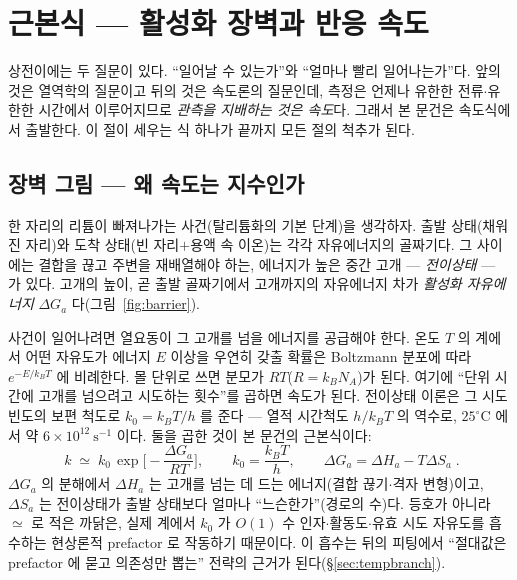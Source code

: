 \documentclass[11pt,a4paper]{article}
\begin{document}
\section{근본식 — 활성화 장벽과 반응 속도}\label{sec:rate}
상전이에는 두 질문이 있다. ``일어날 수 있는가''와 ``얼마나 빨리 일어나는가''다. 앞의 것은 열역학의 질문이고
뒤의 것은 속도론의 질문인데, 측정은 언제나 유한한 전류$\cdot$유한한 시간에서 이루어지므로 \emph{관측을
지배하는 것은 속도}다. 그래서 본 문건은 속도식에서 출발한다. 이 절이 세우는 식 하나가 끝까지 모든 절의
척추가 된다.

\subsection{장벽 그림 — 왜 속도는 지수인가}
한 자리의 리튬이 빠져나가는 사건(탈리튬화의 기본 단계)을 생각하자. 출발 상태(채워진 자리)와 도착 상태(빈
자리$+$용액 속 이온)는 각각 자유에너지의 골짜기다. 그 사이에는 결합을 끊고 주변을 재배열해야 하는, 에너지가
높은 중간 고개 — \emph{전이상태} — 가 있다. 고개의 높이, 곧 출발 골짜기에서 고개까지의 자유에너지 차가
\emph{활성화 자유에너지} $\Delta G_a$ 다(그림~\ref{fig:barrier}).

사건이 일어나려면 열요동이 그 고개를 넘을 에너지를 공급해야 한다. 온도 $T$ 의 계에서 어떤 자유도가 에너지
$E$ 이상을 우연히 갖출 확률은 Boltzmann 분포에 따라 $e^{-E/k_BT}$ 에 비례한다. 몰 단위로 쓰면 분모가
$RT$($R=k_BN_A$)가 된다. 여기에 ``단위 시간에 고개를 넘으려고 시도하는 횟수''를 곱하면 속도가 된다.
전이상태 이론은 그 시도 빈도의 보편 척도로 $k_0=k_BT/h$ 를 준다 \cite{eyring1935} — 열적 시간척도
$h/k_BT$ 의 역수로, $25^\circ$C 에서 약 $6\times10^{12}\ \mathrm{s^{-1}}$ 이다. 둘을 곱한 것이 본 문건의
근본식이다:
\begin{equation}
\boxed{\;k\;\simeq\;k_0\,\exp\!\Big[-\frac{\Delta G_a}{RT}\Big],\qquad
k_0=\frac{k_BT}{h},\qquad \Delta G_a=\Delta H_a-T\Delta S_a\;.}
\label{eq:eyring}
\end{equation}
$\Delta G_a$ 의 분해에서 $\Delta H_a$ 는 고개를 넘는 데 드는 에너지(결합 끊기$\cdot$격자 변형)이고,
$\Delta S_a$ 는 전이상태가 출발 상태보다 얼마나 ``느슨한가''(경로의 수)다. 등호가 아니라 $\simeq$ 로 적은
까닭은, 실제 계에서 $k_0$ 가 $O(1)$ 수 인자$\cdot$활동도$\cdot$유효 시도 자유도를 흡수하는 현상론적
prefactor 로 작동하기 때문이다. 이 흡수는 뒤의 피팅에서 ``절대값은 prefactor 에 묻고 의존성만 뽑는'' 전략의
근거가 된다(\S\ref{sec:tempbranch}).
\end{document}
